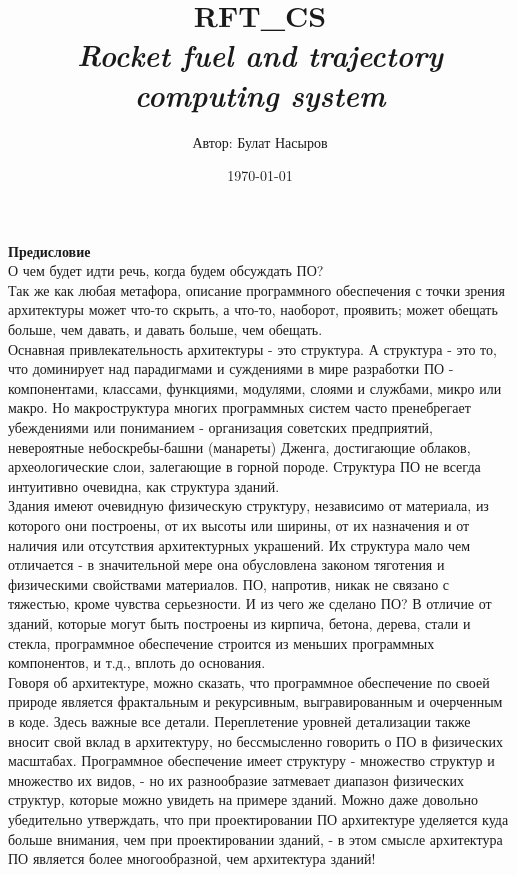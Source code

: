 \documentclass[a4paper, 12pt]{report}
\author{Автор: Булат Насыров}
\title{RFT\_CS \\ \footnotesize{\textit{Rocket fuel and trajectory computing system}}}
\date{\today}
\begin{document}
\maketitle

\tableofcontents{}
\clearpage
{\bfseries\Huge Предисловие}\\

\textrm{
    О чем будет идти речь, когда будем обсуждать ПО?\\
    Так же как любая метафора, описание программного обеспечения с точки зрения архитектуры может что-то скрыть, а что-то, наоборот, проявить; может обещать больше, чем давать, и давать больше, чем обещать. \\
    Оснавная привлекательность архитектуры - это структура. А структура - это то, что доминирует над парадигмами и суждениями в мире разработки ПО - компонентами, классами, функциями, модулями, слоями и службами, микро или макро. Но макроструктура многих программных систем часто пренебрегает убеждениями или пониманием - организация советских предприятий, невероятные небоскребы-башни (манареты) Дженга, достигающие облаков, археологические слои, залегающие в горной породе. Структура ПО не всегда интуитивно очевидна, как структура зданий.\\
    Здания имеют очевидную физическую структуру, независимо от материала, из которого они построены, от их высоты или ширины, от их назначения и от наличия или отсутствия архитектурных украшений. Их структура мало чем отличается - в значительной мере она обусловлена законом тяготения и физическими свойствами материалов. ПО, напротив, никак не связано с тяжестью, кроме чувства серьезности. И из чего же сделано ПО? В отличие от зданий, которые могут быть построены из кирпича, бетона, дерева, стали и стекла, программное обеспечение строится из меньших программных компонентов, и т.д., вплоть до основания.\\
    Говоря об архитектуре, можно сказать, что программное обеспечение по своей природе является фрактальным и рекурсивным, выгравированным и очерченным в коде. Здесь важные все детали. Переплетение уровней детализации также вносит свой вклад в архитектуру, но бессмысленно говорить о ПО в физических масштабах. Программное обеспечение имеет структуру - множество структур и множество их видов, - но их разнообразие затмевает диапазон физических структур, которые можно увидеть на примере зданий. Можно даже довольно убедительно утверждать, что при проектировании ПО архитектуре уделяется куда больше внимания, чем при проектировании зданий, - в этом смысле архитектура ПО является более многообразной, чем архитектура зданий!\\
}
\end{document}
